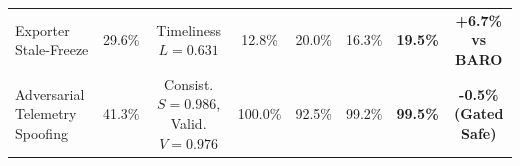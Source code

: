 \begin{table}[t]
{\begin{tabular}{ll|ccc|ccc|ccc}
\hline
Exporter Stale-Freeze & 29.6\% & Timeliness $L=0.631$ & 12.8\% & 20.0\% & 16.3\% & \multicolumn{3}{c|}{\textbf{19.5\%}} & \multicolumn{2}{c}{\textbf{+6.7\% vs BARO}} \\
Adversarial Telemetry Spoofing & 41.3\% & Consist. $S=0.986$, Valid. $V=0.976$ & 100.0\% & 92.5\% & 99.2\% & \multicolumn{3}{c|}{\textbf{99.5\%}} & \multicolumn{2}{c}{\textbf{-0.5\% (Gated Safe)}} \\
\hline
\end{tabular}
}
\end{table}